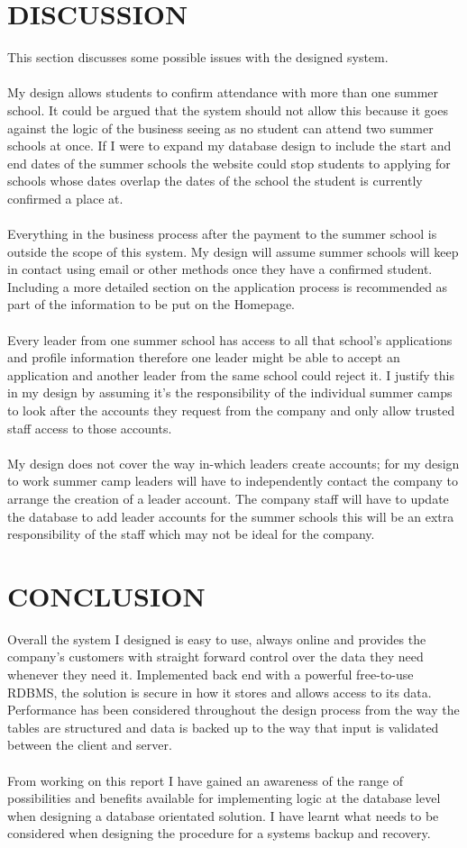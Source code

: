 \documentclass{project}
\begin{document}
\section{DISCUSSION}
This section discusses some possible issues with the designed system.
\\\\
My design allows students to confirm attendance with more than one summer school. It could be argued that the system should not allow this because it goes against the logic of the business seeing as no student can attend two summer schools at once. If I were to expand my database design to include the start and end dates of the summer schools the website could stop students to applying for schools whose dates overlap the dates of the school the student is currently confirmed a place at.
\\\\
Everything in the business process after the payment to the summer school is outside the scope of this system. My design will assume summer schools will keep in contact using email or other methods once they have a confirmed student. Including a more detailed section on the application process is recommended as part of the information to be put on the Homepage.
\\\\
Every leader from one summer school has access to all that school's applications and profile information therefore one leader might be able to accept an application and another leader from the same school could reject it. I justify this in my design by assuming it's the responsibility of the individual summer camps to look after the accounts they request from the company and only allow trusted staff access to those accounts.
\\\\
My design does not cover the way in-which leaders create accounts; for my design to work summer camp leaders will have to independently contact the company to arrange the creation of a leader account. The company staff will have to update the database to add leader accounts for the summer schools this will be an extra responsibility of the staff which may not be ideal for the company.  
\newpage
\section{CONCLUSION}
Overall the system I designed is easy to use, always online and provides the company's customers with straight forward control over the data they need whenever they need it.
Implemented back end with a powerful free-to-use RDBMS, the solution is secure in how it stores and allows access to its data. Performance has been considered throughout the design process from the way the tables are structured and data is backed up to the way that input is validated between the client and server.
\\\\
From working on this report I have gained an awareness of the range of possibilities and benefits available for implementing logic at the database level when designing a database orientated solution.
I have learnt what needs to be considered when designing the procedure for a systems backup and recovery.  
\newpage
\end{document}
